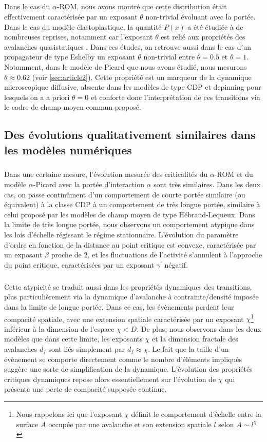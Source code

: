 \subparagraph{}Dans le cas du $\alpha$-ROM, nous avons montré que cette distribution était effectivement caractérisée par un exposant $\theta$ non-trivial évoluant avec la portée. Dans le cas du modèle élastoplastique, la quantité $P(x)$ a été étudiée à de nombreuses reprises, notamment car l'exposant $\theta$ est relié aux propriétés des avalanches quasistatiques \cite{lin_scaling_2014, ferrero_criticality_2019, liu_driving_2016, lin_mean-field_2016}. Dans ces études, on retrouve aussi dans le cas d'un propagateur de type Eshelby un exposant $\theta$ non-trivial entre $\theta = 0.5$ et $\theta = 1$. Notamment, dans le modèle de Picard que nous avons étudié, nous mesurons $\theta \approx 0.62$ (voir \autoref{sec:article2}). Cette propriété est un marqueur de la dynamique microscopique diffusive, absente dans les modèles de type CDP et depinning pour lesquels on a a priori $\theta = 0$ \cite{lin_scaling_2014} et conforte donc l'interprétation de ces transitions via le cadre de champ moyen commun proposé.

\subsection{Des évolutions qualitativement similaires dans les modèles numériques}

\subparagraph{}Dans une certaine mesure, l'évolution mesurée des criticalités du $\alpha$-ROM et du modèle $\alpha$-Picard avec la portée d'interaction $\alpha$ sont très similaires. Dans les deux cas, on passe continûment d'un comportement de courte portée similaire (ou équivalent) à la classe CDP à un comportement de très longue portée, similaire à celui proposé par les modèles de champ moyen de type Hébraud-Lequeux. Dans la limite de très longue portée, nous observons un comportement atypique dans les lois d'échelle régissant le régime stationnaire. L'évolution du paramètre d'ordre en fonction de la distance au point critique est convexe, caractérisée par un exposant $\beta$ proche de $2$, et les fluctuations de l'activité s'annulent à l'approche du point critique, caractérisées par un exposant $\gamma^\prime$ négatif.

\subparagraph{}Cette atypicité se traduit aussi dans les propriétés dynamiques des transitions, plus particulièrement via la dynamique d'avalanche à contrainte/densité imposée dans la limite de longue portée. Dans ce cas, les évènements perdent leur compacité spatiale, avec une extension spatiale caractérisée par un exposant $\chi$\footnote{Nous rappelons ici que l'exposant $\chi$ définit le comportement d'échelle entre la surface $A$ occupée par une avalanche et son extension spatiale $l$ selon $A\sim l^\chi$} inférieur à la dimension de l'espace $\chi < D$. De plus, nous observons dans les deux modèles que dans cette limite, les exposants $\chi$ et la dimension fractale des avalanches $d_f$ sont liés simplement par $d_f\approx \chi$. Le fait que la taille d'un évènement se comporte directement comme le nombre d'éléments impliqués suggère une sorte de simplification de la dynamique. L'évolution des propriétés critiques dynamiques repose alors essentiellement sur l'évolution de $\chi$ qui présente une perte de compacité supposée continue.

